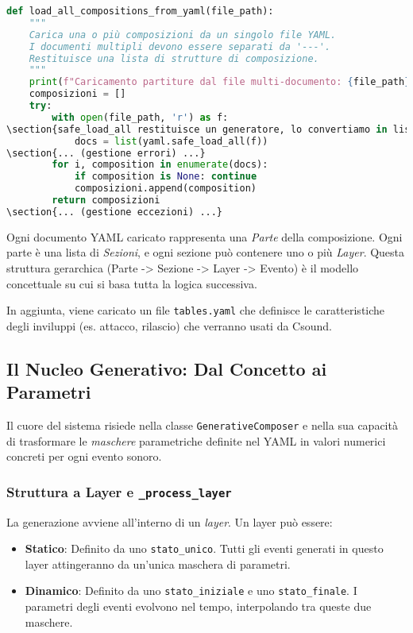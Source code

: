 \begin{lstlisting}[language=Python]
def load_all_compositions_from_yaml(file_path):
    """
    Carica una o più composizioni da un singolo file YAML.
    I documenti multipli devono essere separati da '---'.
    Restituisce una lista di strutture di composizione.
    """
    print(f"Caricamento partiture dal file multi-documento: {file_path}")
    composizioni = []
    try:
        with open(file_path, 'r') as f:
\section{safe_load_all restituisce un generatore, lo convertiamo in lista}
            docs = list(yaml.safe_load_all(f))
\section{... (gestione errori) ...}
        for i, composition in enumerate(docs):
            if composition is None: continue 
            composizioni.append(composition)
        return composizioni
\section{... (gestione eccezioni) ...}
\end{lstlisting}

Ogni documento YAML caricato rappresenta una \textit{Parte} della composizione. Ogni parte è una lista di \textit{Sezioni}, e ogni sezione può contenere uno o più \textit{Layer}. Questa struttura gerarchica (Parte -> Sezione -> Layer -> Evento) è il modello concettuale su cui si basa tutta la logica successiva.

In aggiunta, viene caricato un file \texttt{tables.yaml} che definisce le caratteristiche degli inviluppi (es. attacco, rilascio) che verranno usati da Csound.
\subsection{Il Nucleo Generativo: Dal Concetto ai Parametri}
Il cuore del sistema risiede nella classe \texttt{GenerativeComposer} e nella sua capacità di trasformare le \textit{maschere} parametriche definite nel YAML in valori numerici concreti per ogni evento sonoro.
\subsubsection{Struttura a Layer e \texttt{\_process\_layer}}
La generazione avviene all'interno di un \textit{layer}. Un layer può essere:
\begin{itemize}
    \item \textbf{Statico}: Definito da uno \texttt{stato\_unico}. Tutti gli eventi generati in questo layer attingeranno da un'unica maschera di parametri.
    \item \textbf{Dinamico}: Definito da uno \texttt{stato\_iniziale} e uno \texttt{stato\_finale}. I parametri degli eventi evolvono nel tempo, interpolando tra queste due maschere.
\end{itemize}

